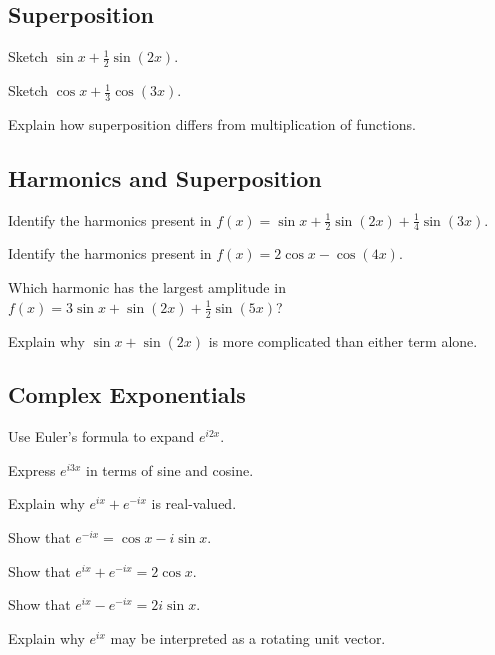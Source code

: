 \subsection*{Superposition}
\begin{exercise}
Sketch $\sin x + \tfrac12\sin(2x)$.
\end{exercise}
\begin{exercise}
Sketch $\cos x + \tfrac13\cos(3x)$.
\end{exercise}
\begin{exercise}
Explain how superposition differs from multiplication of functions.
\end{exercise}

\subsection*{Harmonics and Superposition}
\begin{exercise}
Identify the harmonics present in $f(x) = \sin x + \tfrac12\sin(2x) +
\tfrac14\sin(3x)$.
\end{exercise}
\begin{exercise}
Identify the harmonics present in $f(x) = 2\cos x - \cos(4x)$.
\end{exercise}
\begin{exercise}
Which harmonic has the largest amplitude in $f(x) = 3\sin x + \sin(2x) +
\tfrac12\sin(5x)$?
\end{exercise}
\begin{exercise}
Explain why $\sin x + \sin(2x)$ is more complicated than either term
alone.
\end{exercise}

\subsection*{Complex Exponentials}
\begin{exercise}
Use Euler's formula to expand $e^{i2x}$.
\end{exercise}
\begin{exercise}
Express $e^{i3x}$ in terms of sine and cosine.
\end{exercise}
\begin{exercise}
Explain why $e^{ix} + e^{-ix}$ is real-valued.
\end{exercise}
\begin{exercise}
Show that $e^{-ix} = \cos x - i\sin x$.
\end{exercise}
\begin{exercise}
Show that $e^{ix} + e^{-ix} = 2\cos x$.
\end{exercise}
\begin{exercise}
Show that $e^{ix} - e^{-ix} = 2i\sin x$.
\end{exercise}
\begin{exercise}
Explain why $e^{ix}$ may be interpreted as a rotating unit vector.
\end{exercise}

